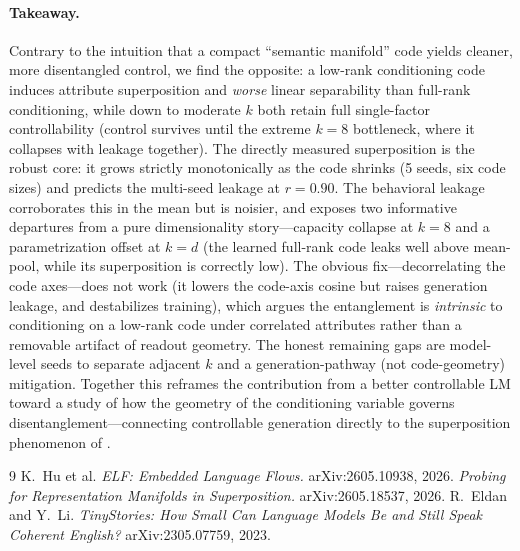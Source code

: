 \documentclass[11pt]{article}
\begin{document}
\paragraph{Takeaway.} Contrary to the intuition that a compact ``semantic
manifold'' code yields cleaner, more disentangled control, we find the opposite:
a low-rank conditioning code induces attribute superposition and \emph{worse}
linear separability than full-rank conditioning, while down to moderate $k$ both
retain full single-factor controllability (control survives until the extreme
$k{=}8$ bottleneck, where it collapses with leakage together). The directly
measured superposition is the robust core: it grows strictly monotonically as the
code shrinks (5 seeds, six code sizes) and predicts the multi-seed leakage at
$r{=}0.90$. The behavioral leakage corroborates this in the mean but is noisier,
and exposes two informative departures from a pure dimensionality story---capacity
collapse at $k{=}8$ and a parametrization offset at $k{=}d$ (the learned full-rank
code leaks well above mean-pool, while its superposition is correctly low). The
obvious fix---decorrelating the code axes---does not work (it lowers the code-axis
cosine but raises generation leakage, and destabilizes training), which argues the
entanglement is \emph{intrinsic} to conditioning on a low-rank code under correlated
attributes rather than a removable artifact of readout geometry. The honest
remaining gaps are model-level seeds to separate adjacent $k$ and a
generation-pathway (not code-geometry) mitigation. Together this reframes the
contribution from a better controllable LM toward a study of how the geometry of
the conditioning variable governs disentanglement---connecting controllable
generation directly to the superposition phenomenon of \cite{manifold2026}.

\begin{thebibliography}{9}
 K.~Hu et al. \emph{ELF: Embedded Language Flows.}
  arXiv:2605.10938, 2026.
 \emph{Probing for Representation Manifolds in
  Superposition.} arXiv:2605.18537, 2026.
 R.~Eldan and Y.~Li. \emph{TinyStories: How Small Can
  Language Models Be and Still Speak Coherent English?} arXiv:2305.07759, 2023.
\end{thebibliography}
\end{document}
